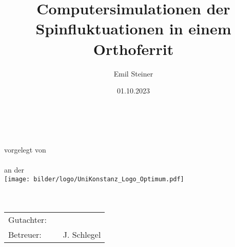 

\usepackage{subfiles} %

\newcommand{\thesisTitle}{
	\begin{sffamily}
		\vspace{0.5em}
		\centering
		\Huge\textbf{\docTitle}\\
		\vspace{2.5em}
		\huge\textbf{\docThesisType}\\		\vspace{1em}
		\vspace{0.1em}
		\centering\large vorgelegt von\\
		\vspace{1em}
		\Large\textbf{\docAuthor}\\
		\vspace{1em}
		an der\\
		\texttt{[image: bilder/logo/UniKonstanz\_Logo\_Optimum.pdf]}\\
		\Large\docUnisection\\
		\Large\docDepartment\\
		\vspace{2em}
		\centering\begin{tabular}{lll}%
			Gutachter: &  & \docSupervisorOne \\
			Betreuer:  &  & J. Schlegel       \\%
		\end{tabular}\\
	\end{sffamily}
}%

\date{01.10.2023}
\author{Emil Steiner}
\title{Computersimulationen der Spinfluktuationen in einem Orthoferrit}
\subtitle{}



\thesisTitle
\thispagestyle{empty}
\newpage

% 

